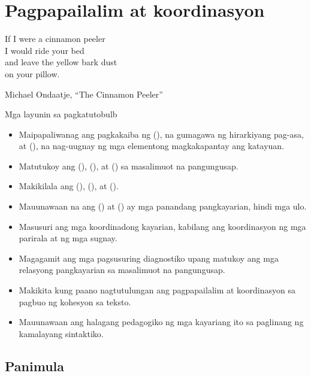 \chapter{Pagpapailalim at koordinasyon} \label{ch:subord-coord-tl}

\epigraph{If I were a cinnamon peeler\\
I would ride your bed\\
and leave the yellow bark dust\\
on your pillow.}{Michael Ondaatje, \enquote{The Cinnamon Peeler}}

\begin{tblsframedsymbol}{Mga layunin sa pagkatuto}{bulb}
\begin{itemize}[noitemsep, leftmargin=*]
    \item Maipapaliwanag ang pagkakaiba ng  (), na gumagawa ng hirarkiyang pag-asa, at  (), na nag-uugnay ng mga elementong magkakapantay ang katayuan.
    \item Matutukoy ang  (),  (), at  () sa masalimuot na pangungusap.
    \item Makikilala ang  (),  (), at  ().
    \item Mauunawaan na ang  () at  () ay mga panandang pangkayarian, hindi mga ulo.
    \item Masusuri ang mga koordinadong kayarian, kabilang ang koordinasyon ng mga parirala at ng mga sugnay.
    \item Magagamit ang mga pagsusuring diagnostiko upang matukoy ang mga relasyong pangkayarian sa masalimuot na pangungusap.
    \item Makikita kung paano nagtutulungan ang pagpapailalim at koordinasyon sa pagbuo ng kohesyon sa teksto.
    \item Mauunawaan ang halagang pedagogiko ng mga kayariang ito sa paglinang ng kamalayang sintaktiko.
\end{itemize}
\end{tblsframedsymbol}

\section{Panimula}

